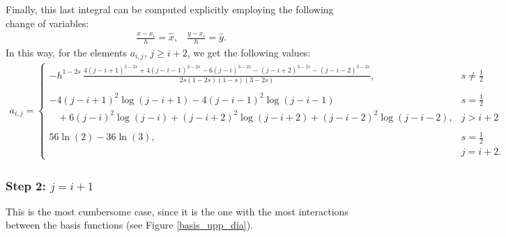 Finally, this last integral can be computed explicitly employing the following  change of variables:
\begin{align}\label{cv}
	\frac{x-x_i}{h}=\hat{x},\;\;\; \frac{y-x_i}{h}=\hat{y}.
\end{align}
In this way, for the elements $a_{i,j}$, $j\geq i+2$, we get the following values: 
\begin{align*}
	a_{i,j} = \begin{cases}
			\displaystyle -h^{1-2s}\,\frac{4(j-i+1)^{3-2s} + 4(j-i-1)^{3-2s}-6(j-i)^{3-2s}-(j-i+2)^{3-2s}-(j-i-2)^{3-2s}}{2s(1-2s)(1-s)(3-2s)}, & \displaystyle s\neq\frac{1}{2} 
			\\
			\\
			-4(j-i+1)^2\log(j-i+1)-4(j-i-1)^2\log(j-i-1) &  \displaystyle s=\frac{1}{2}
			\\
			\;\;\;+6(j-i)^2\log(j-i)+(j-i+2)^2\log(j-i+2)+(j-i-2)^2\log(j-i-2), &  \displaystyle j> i+2
			\\
			\\
			56\ln(2)-36\ln(3), & \displaystyle s=\frac{1}{2}
			\\
			& \displaystyle j= i+2.
		\end{cases}	
\end{align*}

\subsubsection*{Step 2: $j= i+1$}
This is the most cumbersome case, since it is the one with the most interactions between the basis functions (see Figure \ref{basis_upp_dia}). 

